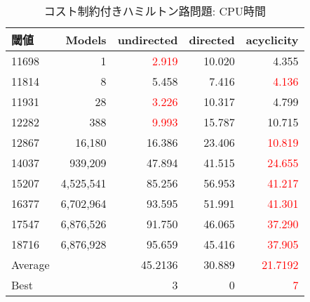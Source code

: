 \begin{table}[htbp]
  \caption{コスト制約付きハミルトン路問題: CPU時間}
  \label{cost_table}
  \centering
  \begin{tabular}{|l|r|rrr|}
    \hline
    閾値    &	Models & \textsf{undirected} & \textsf{directed} & \textsf{acyclicity} \\
    \hline
    11698   &	1      &\textcolor{red}{2.919} &10.020 & 4.355	\\
    11814   &	8      &5.458  &7.416	& \textcolor{red}{4.136}	\\
    11931   &	28     &\textcolor{red}{3.226}&10.317	& 4.799	\\
    12282   &	388    &\textcolor{red}{9.993}&15.787	& 10.715	\\
    12867   &	16,180  &16.386       &23.406	& \textcolor{red}{10.819}\\
    14037   &	939,209 &47.894       &41.515	& \textcolor{red}{24.655}\\
    15207   &	4,525,541&85.256       &56.953	& \textcolor{red}{41.217}\\
    16377   &	6,702,964&93.595       &51.991	& \textcolor{red}{41.301}	\\
    17547   &	6,876,526&91.750       &46.065	& \textcolor{red}{37.290}	\\
    18716   &	6,876,928&95.659       &45.416	& \textcolor{red}{37.905}	\\
    \hline
    Average &   & 45.2136 & 30.889  & \textcolor{red}{21.7192}\\
    Best    &   & 3 & 0 & \textcolor{red}{7} \\
    \hline
  \end{tabular}
\end{table}
